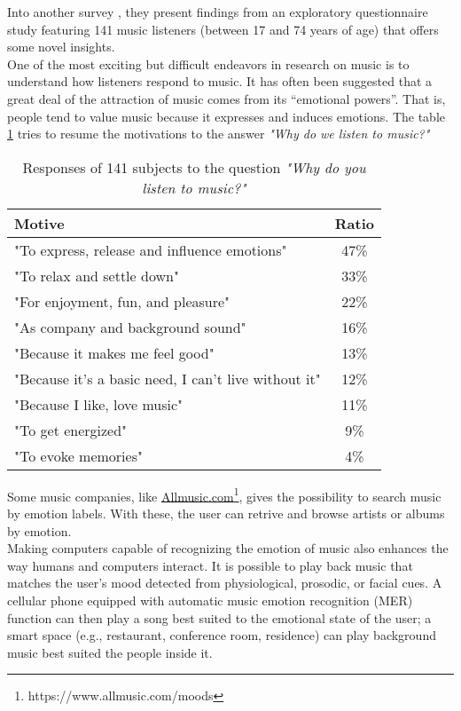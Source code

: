 Into another survey \cite{juslin2004expression}, they present findings from an exploratory questionnaire study featuring 141 music listeners (between 17 and 74 years of age) that offers some novel insights.
\\ 
One of the most exciting but difficult endeavors in research on music is to understand how listeners respond to music. It has often been suggested that a great deal of the attraction of music comes from its “emotional powers”. That is, people tend to value music because it expresses and induces emotions.
The table  \ref{table:motivation_music} tries to resume the motivations to the answer \textit{"Why do we listen to music?"}
\begin{table}[h!]
\centering
\begin{tabular}{|l | c|}
\hline
Motive & Ratio\\ [0.5ex] 
\hline\hline "To express, release and influence emotions"	&	47\%	\\ 
\hline "To relax and settle down"										&	33\%	\\
\hline "For enjoyment, fun, and pleasure"							&	22\%	\\
\hline "As company and background sound"						&	16\%	\\
\hline "Because it makes me feel good"								&	13\%	\\
\hline "Because it's a basic need, I can't live without it"		&	12\%	\\
\hline "Because I like, love music"										&	11\%	\\
\hline "To get energized"													&	9\%	\\
\hline "To evoke memories"												&	4\%	\\ 
\hline
\end{tabular}
\caption{Responses of 141 subjects to the question \textit{"Why do you listen to music?"}}
\label{table:motivation_music}
\end{table}

\indent
Some music companies, like  \href{https://www.allmusic.com/moods}{Allmusic.com}\footnote{https://www.allmusic.com/moods}, gives the possibility to search music by emotion labels. With these, the user can retrive and browse artists or albums by emotion.
\\ \indent
Making computers capable of recognizing the emotion of music also enhances the way humans and computers interact. It is possible to play back music that matches the user’s mood detected from physiological, prosodic, or facial cues. A cellular phone equipped with automatic music emotion recognition (MER) function can then play a song best suited to the emotional state of the user; a smart space (e.g., restaurant, conference room, residence) can play background music best suited the people inside it.

